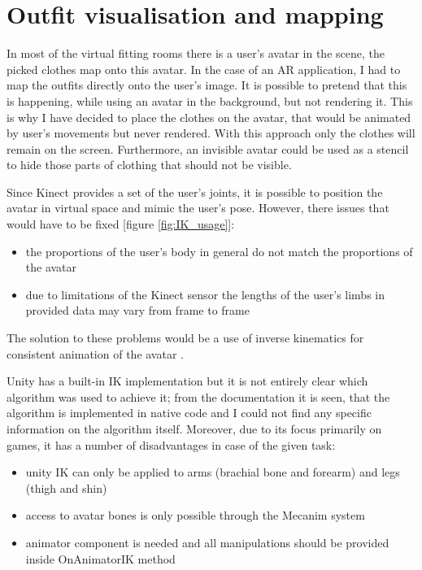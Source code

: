 \documentclass[a4paper]{report}
\begin{document}
\section{Outfit visualisation and mapping}
\label{section_Outfit_visual}

 \qquad In most of the virtual fitting rooms there is a user’s avatar in the scene, the picked clothes map onto this avatar. In the case of an AR application, I had to map the outfits directly onto the user’s image. 
It is possible to pretend that this is happening, while using an avatar in the background, but not rendering it. This is why I have decided to place the clothes on the avatar, that would be animated by user's movements but never rendered. With this approach only the clothes will remain on the screen. Furthermore, an invisible avatar could be used as a stencil to hide those parts of clothing that should not be visible.

\bigskip Since Kinect provides a set of the user’s joints, it is possible to position the avatar in virtual space and mimic the user's pose. However, there issues that would have to be fixed [figure \ref{fig:IK_usage}]:
\begin{itemize}
    \item the proportions of the user’s body in general do not match the proportions of the avatar
    \item due to limitations of the Kinect sensor the lengths of the user’s limbs in provided data may vary from frame to frame
\end{itemize}

The solution to these problems would be a use of inverse kinematics for consistent animation of the avatar \cite{upbodyIK}.

Unity has a built-in IK implementation but it is not entirely clear which algorithm was used to achieve it; from the documentation it is seen, that the algorithm is implemented in native code and I could not find any specific information on the algorithm itself. Moreover, due to its focus primarily on games, it has a number of disadvantages in case of the given task:

\begin{itemize}
\item unity IK can only be applied to arms (brachial bone and forearm) and legs (thigh and shin)
\item access to avatar bones is only possible through the Mecanim system
\item animator component is needed and all manipulations should be provided inside OnAnimatorIK method
\end{itemize}
\end{document}

